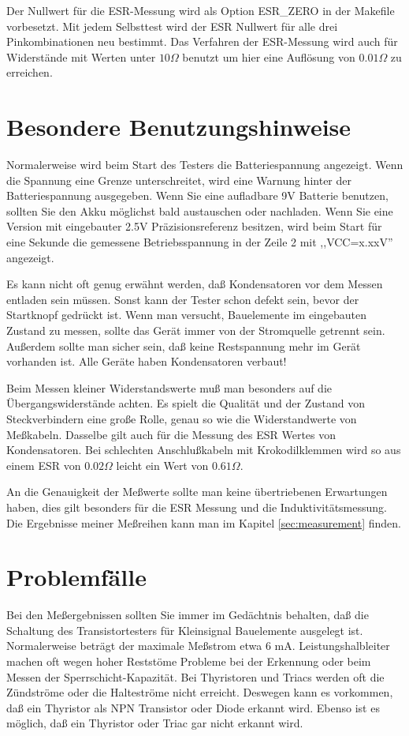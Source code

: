 Der Nullwert für die ESR-Messung wird als Option ESR\_ZERO in der Makefile vorbesetzt.
Mit jedem Selbsttest wird der ESR Nullwert für alle drei Pinkombinationen neu bestimmt.
Das Verfahren der ESR-Messung wird auch für Widerstände mit Werten unter \(10 \Omega\) benutzt um
hier eine Auflösung von \(0.01 \Omega\) zu erreichen.

\section{Besondere Benutzungshinweise}
Normalerweise wird beim Start des Testers die Batteriespannung angezeigt. Wenn die Spannung eine Grenze unterschreitet, 
wird eine Warnung hinter der Batteriespannung ausgegeben. Wenn Sie eine aufladbare 9V Batterie benutzen, sollten Sie
den Akku möglichst bald austauschen oder nachladen.
Wenn Sie eine Version mit eingebauter 2.5V Präzisionsreferenz besitzen, wird beim Start für eine Sekunde die
gemessene Betriebsspannung in der Zeile 2 mit ,,VCC=x.xxV'' angezeigt.

Es kann nicht oft genug erwähnt werden, daß Kondensatoren vor dem Messen entladen sein müssen.
Sonst kann der Tester schon defekt sein, bevor der Startknopf gedrückt ist.
Wenn man versucht, Bauelemente im eingebauten Zustand zu messen, sollte das Gerät immer von
der Stromquelle getrennt sein. Außerdem sollte man sicher sein, daß keine Restspannung mehr
im Gerät vorhanden ist. Alle Geräte haben Kondensatoren verbaut!

Beim Messen kleiner Widerstandswerte muß man besonders auf die Übergangswiderstände achten.
Es spielt die Qualität und der Zustand von Steckverbindern eine große Rolle, genau so wie die
Widerstandwerte von Meßkabeln. Dasselbe gilt auch für die Messung des ESR Wertes von Kondensatoren.
Bei schlechten Anschlußkabeln mit Krokodilklemmen wird so aus einem ESR von \(0.02 \Omega\) leicht
ein Wert von \(0.61 \Omega\).

An die Genauigkeit der Meßwerte sollte man keine übertriebenen Erwartungen haben, dies gilt besonders
für die ESR Messung und die Induktivitätsmessung.
Die Ergebnisse meiner Meßreihen kann man im Kapitel \ref{sec:measurement} finden.


\section{Problemfälle}
Bei den Meßergebnissen sollten Sie immer im Gedächtnis behalten, daß die Schaltung des Transistortesters für
Kleinsignal Bauelemente ausgelegt ist. Normalerweise beträgt der maximale Meßstrom etwa 6 mA.
Leistungshalbleiter machen oft wegen hoher Reststöme Probleme bei der Erkennung oder beim Messen der
Sperrschicht-Kapazität.
Bei Thyristoren und Triacs werden oft die Zündströme oder die Halteströme nicht erreicht. Deswegen kann es
vorkommen, daß ein Thyristor als NPN Transistor oder Diode erkannt wird. Ebenso ist es möglich, daß ein 
Thyristor oder Triac gar nicht erkannt wird.

